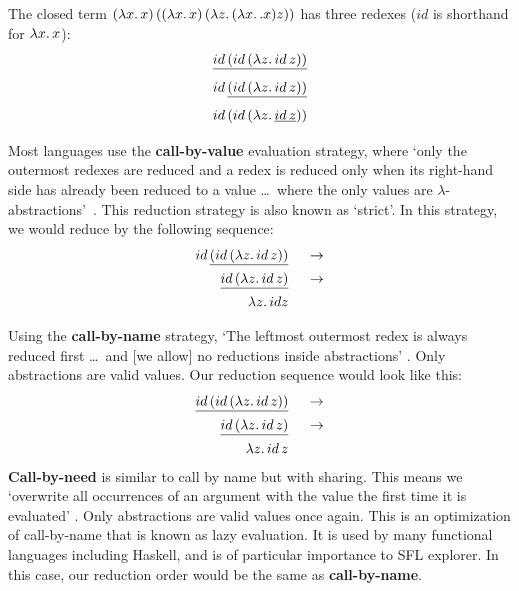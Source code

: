The closed term 
\((\lambda x.\, x)\,((\lambda x.\, x)\,(\lambda z.\, (\lambda x.\,. x) z))\) has three redexes ($id$ is shorthand for $\lambda x.\, x$):
\[\underline{id\,(id\,(\lambda z.\, id\,z))}\]
\[id\,\underline{(id\,(\lambda z.\, id\,z))}\]
\[id\,(id\,(\lambda z.\, \underline{id\,z}))\]

\noindent Most languages use the \textbf{call-by-value} evaluation strategy, where `only the outermost redexes are reduced and a redex is reduced only when its right-hand side has already been reduced to a value \ldots\ where the only values are $\lambda$-abstractions'~\cite{pierce2002types}. This reduction strategy is also known as `strict'. In this strategy, we would reduce by the following sequence:
\begin{alignat*}{2}
id\,\underline{(id\,(\lambda z.\, id\, z))}  && \;\;\rightarrow\\ 
\underline{id\,(\lambda z.\, id\, z)}        && \;\;\rightarrow\\ 
\lambda z.\, id z                            && \;\;\\ 
\end{alignat*}

\noindent Using the \textbf{call-by-name} strategy, `The leftmost outermost redex is always reduced first \ldots\ and [we allow] no reductions inside abstractions' \cite{pierce2002types}. Only abstractions are valid values. Our reduction sequence would look like this:
\begin{alignat*}{2}
\underline{id\,(id\,(\lambda z.\, id\, z))}  && \;\;\rightarrow\\ 
\underline{id\,(\lambda z.\, id\, z)}        && \;\;\rightarrow\\ 
\lambda z.\, id\, z                          && \;\;\\ 
\end{alignat*}
\noindent \textbf{Call-by-need} is similar to call by name but with sharing. This means we `overwrite all occurrences of an argument with the value the first time it is evaluated' \cite{pierce2002types}. Only abstractions are valid values once again. This is an optimization of call-by-name that is known as lazy evaluation. It is used by many functional languages including Haskell, and is of particular importance to SFL explorer. In this case, our reduction order would be the same as \textbf{call-by-name}. 


